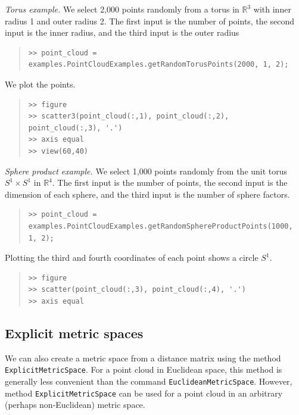 \documentclass[amscd, amssymb, verbatim]{amsart}[12pt]
\theoremstyle{remark}
\theoremstyle{remark}
\theoremstyle{remark}
\newcommand{\R}{\mathbb{R}}
\begin{document}
{\em Torus example.} We select 2,000 points randomly from a torus in $\R^3$ with inner radius 1 and outer radius 2. The first input is the number of points, the second input is the inner radius, and the third input is the outer radius

\begin{quote} \begin{verbatim}
>> point_cloud = examples.PointCloudExamples.getRandomTorusPoints(2000, 1, 2);
\end{verbatim} \end{quote}

We plot the points.

\begin{quote} \begin{verbatim}
>> figure
>> scatter3(point_cloud(:,1), point_cloud(:,2), point_cloud(:,3), '.')
>> axis equal
>> view(60,40)
\end{verbatim} \end{quote}

{\em Sphere product example.} We select 1,000 points randomly from the unit torus $S^1 \times S^1$ in $\R^4$. The first input is the number of points, the second input is the dimension of each sphere, and the third input is the number of sphere factors.

\begin{quote} \begin{verbatim}
>> point_cloud = examples.PointCloudExamples.getRandomSphereProductPoints(1000, 1, 2);
\end{verbatim} \end{quote}

Plotting the third and fourth coordinates of each point shows a circle $S^1$.

\begin{quote} \begin{verbatim}
>> figure
>> scatter(point_cloud(:,3), point_cloud(:,4), '.')
>> axis equal
\end{verbatim} \end{quote}


\subsection{Explicit metric spaces}\label{SS:explicit-metric}
We can also create a metric space from a distance matrix using the method \texttt{ExplicitMetricSpace}. For a point cloud in Euclidean space, this method is generally less convenient than the command \texttt{EuclideanMetricSpace}. However, method \texttt{ExplicitMetricSpace} can be used for a point cloud in an arbitrary (perhaps non-Euclidean) metric space. 
\end{document}
